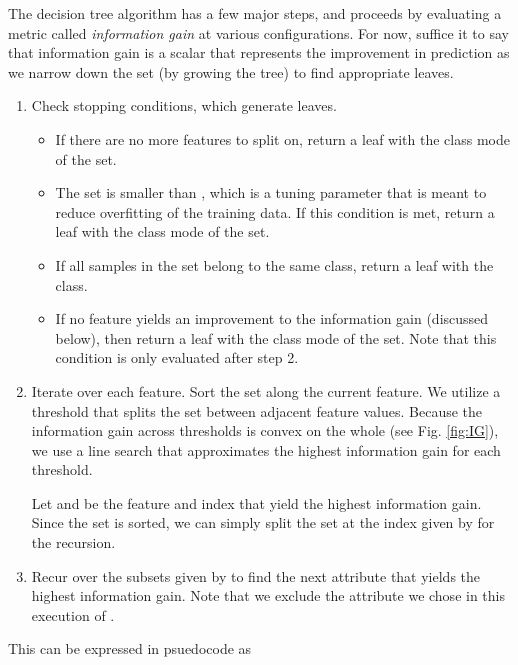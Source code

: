 The decision tree algorithm has a few major steps, and proceeds by evaluating a metric called \emph{information gain} at various configurations. For now, suffice it to say that information gain is a scalar that represents the improvement in prediction as we narrow down the set (by growing the tree) to find appropriate leaves.
%
\begin{enumerate}
\item Check stopping conditions, which generate leaves.
%
  \begin{itemize}
  \item If there are no more features to split on, return a leaf with the class mode of the set. 
  \item The set is smaller than , which is a tuning parameter that is meant to reduce overfitting of the training data. If this condition is met, return a leaf with the class mode of the set.
  \item If all samples in the set belong to the same class, return a leaf with the class.
  \item If no feature yields an improvement to the information gain (discussed below), then return a leaf with the class mode of the set. Note that this condition is only evaluated after step 2. 
  \end{itemize}
\item Iterate over each feature. Sort the set along the current feature. We utilize a threshold that splits the set between adjacent feature values. Because the information gain across thresholds is convex on the whole (see Fig. \ref{fig:IG}), we use a line search that approximates the highest information gain for each threshold. 

  Let  and  be the feature and index that yield the highest information gain. Since the set is sorted, we can simply split the set at the index given by  for the recursion.
\item Recur over the subsets given by  to find the next attribute that yields the highest information gain. Note that we exclude the attribute we chose in this execution of .
\end{enumerate}

This can be expressed in psuedocode as


